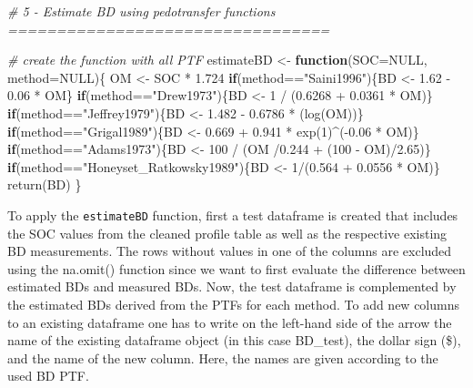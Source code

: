 \documentclass[
  10pt,
  b5paper,
  oneside]{book}
\newenvironment{Shaded}{\begin{snugshade}}{\end{snugshade}}
\newcommand{\AttributeTok}[1]{\textcolor[rgb]{0.77,0.63,0.00}{#1}}
\newcommand{\CommentTok}[1]{\textcolor[rgb]{0.56,0.35,0.01}{\textit{#1}}}
\newcommand{\ConstantTok}[1]{\textcolor[rgb]{0.00,0.00,0.00}{#1}}
\newcommand{\ControlFlowTok}[1]{\textcolor[rgb]{0.13,0.29,0.53}{\textbf{#1}}}
\newcommand{\DecValTok}[1]{\textcolor[rgb]{0.00,0.00,0.81}{#1}}
\newcommand{\FloatTok}[1]{\textcolor[rgb]{0.00,0.00,0.81}{#1}}
\newcommand{\FunctionTok}[1]{\textcolor[rgb]{0.00,0.00,0.00}{#1}}
\newcommand{\NormalTok}[1]{#1}
\newcommand{\OtherTok}[1]{\textcolor[rgb]{0.56,0.35,0.01}{#1}}
\newcommand{\SpecialCharTok}[1]{\textcolor[rgb]{0.00,0.00,0.00}{#1}}
\newcommand{\StringTok}[1]{\textcolor[rgb]{0.31,0.60,0.02}{#1}}
\begin{document}
\begin{Shaded}
\begin{Highlighting}[]
\CommentTok{\# 5 {-} Estimate BD using pedotransfer functions =================================}

\CommentTok{\# create the function with all PTF}
\NormalTok{estimateBD }\OtherTok{\textless{}{-}} \ControlFlowTok{function}\NormalTok{(}\AttributeTok{SOC=}\ConstantTok{NULL}\NormalTok{, }\AttributeTok{method=}\ConstantTok{NULL}\NormalTok{)\{}
\NormalTok{  OM }\OtherTok{\textless{}{-}}\NormalTok{ SOC }\SpecialCharTok{*} \FloatTok{1.724}
  \ControlFlowTok{if}\NormalTok{(method}\SpecialCharTok{==}\StringTok{"Saini1996"}\NormalTok{)\{BD }\OtherTok{\textless{}{-}} \FloatTok{1.62} \SpecialCharTok{{-}} \FloatTok{0.06} \SpecialCharTok{*}\NormalTok{ OM\}}
  \ControlFlowTok{if}\NormalTok{(method}\SpecialCharTok{==}\StringTok{"Drew1973"}\NormalTok{)\{BD }\OtherTok{\textless{}{-}} \DecValTok{1} \SpecialCharTok{/}\NormalTok{ (}\FloatTok{0.6268} \SpecialCharTok{+} \FloatTok{0.0361} \SpecialCharTok{*}\NormalTok{ OM)\}}
  \ControlFlowTok{if}\NormalTok{(method}\SpecialCharTok{==}\StringTok{"Jeffrey1979"}\NormalTok{)\{BD }\OtherTok{\textless{}{-}} \FloatTok{1.482} \SpecialCharTok{{-}} \FloatTok{0.6786} \SpecialCharTok{*}\NormalTok{ (}\FunctionTok{log}\NormalTok{(OM))\}}
  \ControlFlowTok{if}\NormalTok{(method}\SpecialCharTok{==}\StringTok{"Grigal1989"}\NormalTok{)\{BD }\OtherTok{\textless{}{-}} \FloatTok{0.669} \SpecialCharTok{+} \FloatTok{0.941} \SpecialCharTok{*} \FunctionTok{exp}\NormalTok{(}\DecValTok{1}\NormalTok{)}\SpecialCharTok{\^{}}\NormalTok{(}\SpecialCharTok{{-}}\FloatTok{0.06} \SpecialCharTok{*}\NormalTok{ OM)\}}
  \ControlFlowTok{if}\NormalTok{(method}\SpecialCharTok{==}\StringTok{"Adams1973"}\NormalTok{)\{BD }\OtherTok{\textless{}{-}} \DecValTok{100} \SpecialCharTok{/}\NormalTok{ (OM }\SpecialCharTok{/}\FloatTok{0.244} \SpecialCharTok{+}\NormalTok{ (}\DecValTok{100} \SpecialCharTok{{-}}\NormalTok{ OM)}\SpecialCharTok{/}\FloatTok{2.65}\NormalTok{)\}}
  \ControlFlowTok{if}\NormalTok{(method}\SpecialCharTok{==}\StringTok{"Honeyset\_Ratkowsky1989"}\NormalTok{)\{BD }\OtherTok{\textless{}{-}} \DecValTok{1}\SpecialCharTok{/}\NormalTok{(}\FloatTok{0.564} \SpecialCharTok{+} \FloatTok{0.0556} \SpecialCharTok{*}\NormalTok{ OM)\}}
  \FunctionTok{return}\NormalTok{(BD)}
\NormalTok{\}}
\end{Highlighting}
\end{Shaded}

To apply the \texttt{estimateBD} function, first a test dataframe is created that includes the SOC values from the cleaned profile table as well as the respective existing BD measurements. The rows without values in one of the columns are excluded using the na.omit() function since we want to first evaluate the difference between estimated BDs and measured BDs.
Now, the test dataframe is complemented by the estimated BDs derived from the PTFs for each method. To add new columns to an existing dataframe one has to write on the left-hand side of the arrow the name of the existing dataframe object (in this case BD\_test), the dollar sign (\$), and the name of the new column. Here, the names are given according to the used BD PTF.
\end{document}

